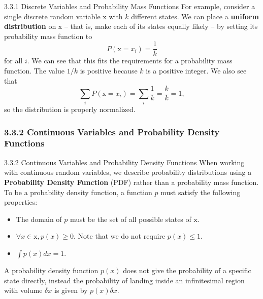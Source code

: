 \begin{frame}{3.3.1 Discrete Variables and Probability Mass Functions}
    \justifying
    For example, consider a single discrete random variable $\mathrm{x}$ with $k$ different states. We can place a \textbf{uniform distribution} on $\mathrm{x}$ -- that is, make each of its states equally likely -- by setting its probability mass function to
    \begin{equation}
        P(\mathrm{x} = x_{i}) = \frac{1}{k}
        \label{eq:3_1}
    \end{equation}
    for all $i$. We can see that this fits the requirements for a probability mass function. The value $1/k$ is positive because $k$ is a positive integer. We also see that
    \begin{equation}
        \sum_{i}P(\mathrm{x} = x_{i}) = \sum_{i}\frac{1}{k}=\frac{k}{k} = 1,
        \label{eq:3_2}
    \end{equation}
    so the distribution is properly normalized.
\end{frame}{}

\subsubsection{3.3.2 Continuous Variables and Probability Density Functions}
\begin{frame}{3.3.2 Continuous Variables and Probability Density Functions}
    \justifying
    When working with continuous random variables, we describe probability distributions using a \textbf{Probability Density Function} (PDF) rather than a probability mass function. To be a probability density function, a function $p$ must satisfy the following properties:
    \begin{itemize}
        \justifying
        \item The domain of $p$ must be the set of all possible states of $\mathrm{x}$.
        \item $\forall x \in \mathrm{x}, p(x) \geq 0$. Note that we do not require $p(x) \leq 1$.
        \item $\int p(x) dx = 1$.
    \end{itemize}
    A probability density function $p(x)$ does not give the probability of a specific state directly, instead the probability of landing inside an infinitesimal region with volume $\delta x$ is given by $p(x)\delta x$.
\end{frame}

